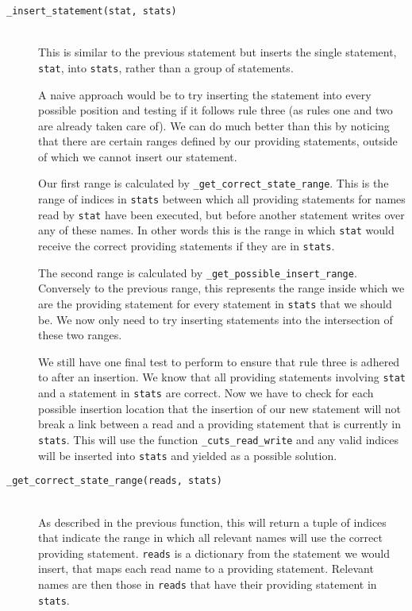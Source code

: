 \documentclass[twoside,a4paper]{report}
\begin{document}
\begin{description}
\item[\texttt{\_insert\_statement(stat, stats)}] \hfill \\
This is similar to the previous statement but inserts the single statement, \texttt{stat}, into \texttt{stats}, rather than a group of statements.

A naive approach would be to try inserting the statement into every possible position and testing if it follows rule three (as rules one and two are
already taken care of). We can do much better than this by noticing that there are certain ranges defined by our providing statements, outside of
which we cannot insert our statement.

Our first range is calculated by \texttt{\_get\_correct\_state\_range}. This is the range of indices in \texttt{stats} between which all providing
statements for names read by \texttt{stat} have been executed, but before another statement writes over any of these names. In other words this is
the range in which \texttt{stat} would receive the correct providing statements if they are in \texttt{stats}.

The second range is  calculated by \texttt{\_get\_possible\_insert\_range}. Conversely to the previous range, this represents the range inside which
we are the providing statement for every statement in \texttt{stats} that we should be. We now only need to try inserting statements into the
intersection of these two ranges.

We still have one final test to perform to ensure that rule three is adhered to after an insertion. We know that all providing statements involving
\texttt{stat} and a statement in \texttt{stats} are correct. Now we have to check for each possible insertion location that the insertion of our
new statement will not break a link between a read and a providing statement that is currently in \texttt{stats}. This will use the function
\texttt{\_cuts\_read\_write} and any valid indices will be inserted into \texttt{stats} and yielded as a possible solution.

\item[\texttt{\_get\_correct\_state\_range(reads, stats)}] \hfill \\
As described in the previous function, this will return a tuple of indices that indicate the range in which all relevant names will use the correct
providing statement. \texttt{reads} is a dictionary from the statement we would insert, that maps each read name to a providing statement. Relevant
names are then those in \texttt{reads} that have their providing statement in \texttt{stats}.


\end{description}
\end{document}
